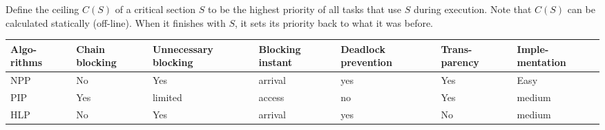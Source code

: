 Define the ceiling $C(S)$ of a critical section $S$ to be the highest priority
of all tasks that use $S$ during execution. Note that $C(S)$ can be calculated
statically (off-line). When it finishes with $S$, it sets its priority back to
what it was before.
\begin{table}[H]
    \centering
    \begin{tabularx}{\columnwidth}{
            @{}
            >{\hsize=0.95\hsize}X %
            >{\hsize=0.95\hsize}X %
            >{\hsize=1.2\hsize}X  %
            >{\hsize=0.95\hsize}X %
            >{\hsize=0.95\hsize}X %
            >{\hsize=0.95\hsize}X %
            >{\hsize=0.95\hsize}X %
            @{}
        } %
        \toprule
        Algo- rithms & Chain blocking & Unnecessary blocking & Blocking instant & Deadlock prevention & Trans- parency & Imple- mentation \\
        \midrule
        NPP          & No             & Yes                  & arrival          & yes                 & Yes            & Easy             \\
        PIP          & Yes            & limited              & access           & no                  & Yes            & medium           \\
        HLP          & No             & Yes                  & arrival          & yes                 & No             & medium           \\
        \bottomrule
    \end{tabularx}
\end{table}
